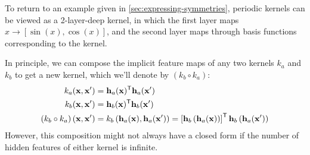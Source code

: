 To return to an example given in \cref{sec:expressing-symmetries}, periodic kernels can be viewed as a 2-layer-deep kernel, in which the first layer maps $x \rightarrow [\sin(x), \cos(x)]$, and the second layer maps through basis functions corresponding to the  kernel.

 


In principle, we can compose the implicit feature maps of any two kernels $k_a$ and $k_b$ to get a new kernel, which we'll denote by $\left( k_b \circ k_a \right)$:
%
\begin{align}
k_a({\bf{x}}, {\bf{x}}') & = {\bf{h}}_a({\bf{x}}) ^{\mathsf{T}} {\bf{h}}_a({\bf{x}}') \\
k_b({\bf{x}}, {\bf{x}}') & = {\bf{h}}_b({\bf{x}}) ^{\mathsf{T}} {\bf{h}}_b({\bf{x}}') \\
\left( k_b \circ k_a \right)({\bf{x}}, {\bf{x}}') & = k_b \left({\bf{h}}_a({\bf{x}}), {\bf{h}}_a({\bf{x}}') \right) 
 = \left[ {\bf{h}}_b \left( {\bf{h}}_a({\bf{x}}) \right)\right] ^{\mathsf{T}} {\bf{h}}_b \left({\bf{h}}_a({\bf{x}}') \right)
\end{align}
%
However, this composition might not always have a closed form if the number of hidden features of either kernel is infinite.

